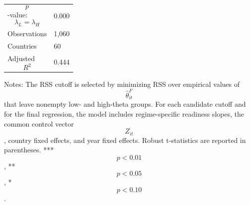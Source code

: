 \begin{table}[H]
\begin{threeparttable}
\begin{tabularx}{\textwidth}{lY}
$$p$$-value: $$\lambda_L=\lambda_H$$ & 0.000 \\
Observations & 1,060 \\
Countries & 60 \\
Adjusted $$R^2$$ & 0.444 \\
\bottomrule
\end{tabularx}
\begin{tablenotes}[flushleft]\footnotesize
\item Notes: The RSS cutoff is selected by minimizing RSS over empirical values of $$\widehat{\theta}^{F}_{it}$$ that leave nonempty low- and high-theta groups. For each candidate cutoff and for the final regression, the model includes regime-specific readiness slopes, the common control vector $$Z_{it}$$, country fixed effects, and year fixed effects. Robust t-statistics are reported in parentheses. *** $$p<0.01$$, ** $$p<0.05$$, * $$p<0.10$$.
\end{tablenotes}
\end{threeparttable}
\end{table}
